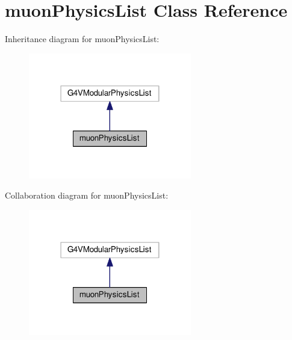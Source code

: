 \hypertarget{classmuonPhysicsList}{}\section{muon\+Physics\+List Class Reference}
\label{classmuonPhysicsList}


Inheritance diagram for muon\+Physics\+List\+:\nopagebreak
\begin{figure}[H]
\begin{center}
\leavevmode
\includegraphics[width=202pt]{classmuonPhysicsList__inherit__graph}
\end{center}
\end{figure}


Collaboration diagram for muon\+Physics\+List\+:\nopagebreak
\begin{figure}[H]
\begin{center}
\leavevmode
\includegraphics[width=202pt]{classmuonPhysicsList__coll__graph}
\end{center}
\end{figure}
